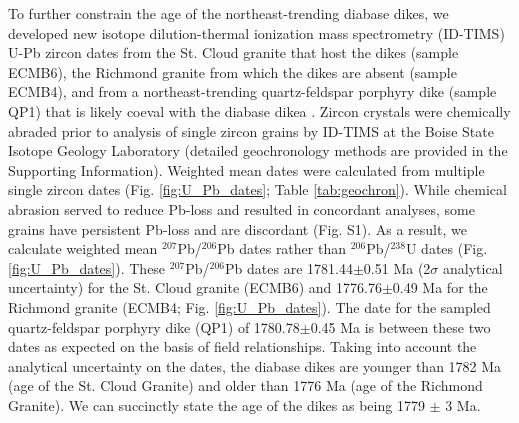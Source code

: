 \documentclass[draft]{agujournal2019}
\begin{document}
To further constrain the age of the northeast-trending diabase dikes, we developed new isotope dilution-thermal ionization mass spectrometry (ID-TIMS) U-Pb zircon dates from the St. Cloud granite that host the dikes (sample ECMB6), the Richmond granite from which the dikes are absent (sample ECMB4), and from a northeast-trending quartz-feldspar porphyry dike (sample QP1) that is likely coeval with the diabase dikea . Zircon crystals were chemically abraded prior to analysis of single zircon grains by ID-TIMS at the Boise State Isotope Geology Laboratory (detailed geochronology methods are provided in the Supporting Information). Weighted mean dates were calculated from multiple single zircon dates (Fig. \ref{fig:U_Pb_dates}; Table \ref{tab:geochron}). While chemical abrasion served to reduce Pb-loss and resulted in concordant analyses, some grains have persistent Pb-loss and are discordant (Fig. S1). As a result, we calculate weighted mean  $^{207}$Pb/$^{206}$Pb dates rather than $^{206}$Pb/$^{238}$U dates (Fig. \ref{fig:U_Pb_dates}). These $^{207}$Pb/$^{206}$Pb dates are 1781.44$\pm$0.51 Ma (2$\sigma$ analytical uncertainty) for the St. Cloud granite (ECMB6) and 1776.76$\pm$0.49 Ma for the Richmond granite (ECMB4; Fig. \ref{fig:U_Pb_dates}). The date for the sampled quartz-feldspar porphyry dike (QP1) of 1780.78$\pm$0.45 Ma is between these two dates as expected on the basis of field relationships. Taking into account the analytical uncertainty on the dates, the diabase dikes are younger than 1782 Ma (age of the St. Cloud Granite) and older than 1776 Ma (age of the Richmond Granite). We can succinctly state the age of the dikes as being 1779 $\pm$ 3 Ma. 
\end{document}

